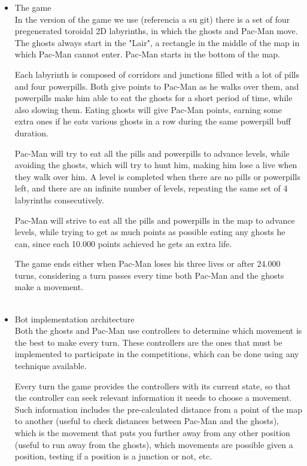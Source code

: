 \documentclass{llncs}
\newcommand{\paco}{Pac-Man }
\begin{document}
\begin{itemize}

\item The game
\\

In the version of the game we use {\color{red}(referencia a su git)} there is a set of four pregenerated toroidal 2D labyrinths, in which the ghosts and \paco move. The ghosts always start in the "Lair", a rectangle in the middle of the map in which \paco cannot enter. \paco starts in the bottom of the map.

Each labyrinth is composed of corridors and junctions filled with a lot of pills and four powerpills. Both give points to \paco as he walks over them, and powerpills make him able to eat the ghosts for a short period of time, while also slowing them. Eating ghosts will give \paco points, earning some extra ones if he eats various ghosts in a row during the same powerpill buff duration.

\paco will try to eat all the pills and powerpills to advance levels, while avoiding the ghosts, which will try to hunt him, making him lose a live when they walk over him. A level is completed when there are no pills or powerpills left, and there are an infinite number of levels, repeating the same set of 4 labyrinths consecutively.

\paco will strive to eat all the pills and powerpills in the map to advance levels, while trying to get as much points as possible eating any ghosts he can, since each 10.000 points achieved he gets an extra life.

The game ends either when \paco loses his three lives or after 24.000 turns, considering a turn passes every time both \paco and the ghosts make a movement.
\\
\\

\item Bot implementation architecture
\\

Both the ghosts and \paco use controllers to determine which movement is the best to make every turn. These controllers are the ones that must be implemented to participate in the competitions, which can be done using any technique available.

Every turn the game provides the controllers with its current state, so that the controller can seek relevant information it needs to choose a movement. Such information includes the pre-calculated distance from a point of the map to another (useful to check distances between \paco and the ghosts), which is the movement that puts you further away from any other position (useful to run away from the ghosts), which movements are possible given a position, testing if a position is a junction or not, etc. 


\end{itemize}
\end{document}
